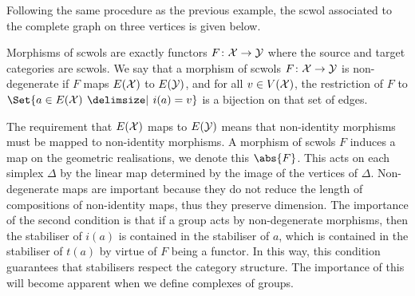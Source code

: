 \begin{example}
	Following the same procedure as the previous example, the scwol associated to the complete graph on three vertices is given below.
	\begin{center}
	\end{center}
	\label{eg:K3_scwol}
\end{example}


\begin{definition}
	Morphisms of scwols are exactly functors $F \colon \mathcal{X} \to \mathcal{Y}$ where the source and target categories are scwols.
	We say that a morphism of scwols $F \colon \mathcal{X} \to \mathcal{Y}$ is non-degenerate if $F$ maps $E(\mathcal{X})$ to  $E(\mathcal{Y})$, and for all $v \in V(\mathcal{X})$, the restriction of  $F$ to $\Set{a \in E(\calx) \given i(a) = v}$ is a bijection on that set of edges.
\end{definition}


The requirement that $E(\mathcal{X})$ maps to $E(\mathcal{Y})$ means that non-identity morphisms must be mapped to non-identity morphisms.
A morphism of scwols $F$ induces a map on the geometric realisations, we denote this $\abs{F}$.
This acts on each simplex $\Delta$ by the linear map determined by the image of the vertices of $\Delta$.
Non-degenerate maps are important because they do not reduce the length of compositions of non-identity maps, thus they preserve dimension.
The importance of the second condition is that if a group acts by non-degenerate morphisms, then the stabiliser of $i(a)$ is contained in the stabiliser of $a$, which is contained in the stabiliser of $t(a)$ by virtue of $F$  being a functor.
In this way, this condition guarantees that stabilisers respect the category structure.
The importance of this will become apparent when we define complexes of groups.

